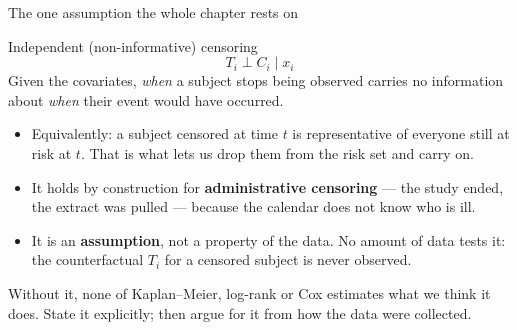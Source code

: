 \documentclass[aspectratio=169,11pt]{beamer}
\begin{document}
\begin{frame}{The one assumption the whole chapter rests on}
  \scriptsize
  \begin{block}{Independent (non-informative) censoring}
    \[
      \boxed{\;T_i \perp C_i \;\big|\; x_i \;}
    \]
    Given the covariates, \emph{when} a subject stops being observed carries no
    information about \emph{when} their event would have occurred.
  \end{block}
  \begin{readme}
    \begin{itemize}
      \item Equivalently: a subject censored at time $t$ is representative of everyone
            still at risk at $t$. That is what lets us drop them from the risk set and
            carry on.
      \item It holds by construction for \textbf{administrative censoring} --- the study
            ended, the extract was pulled --- because the calendar does not know who is ill.
      \item It is an \textbf{assumption}, not a property of the data. No amount of data
            tests it: the counterfactual $T_i$ for a censored subject is never observed.
    \end{itemize}
  \end{readme}
  \begin{takeaway}
    Without it, none of Kaplan--Meier, log-rank or Cox estimates what we think it does.
    State it explicitly; then argue for it from how the data were collected.
  \end{takeaway}
\end{frame}
\end{document}
